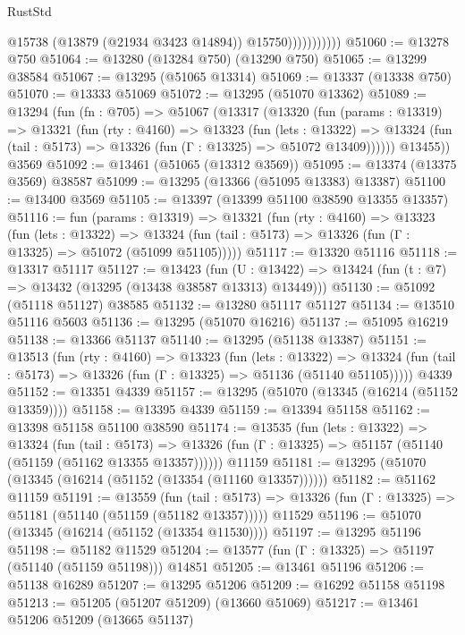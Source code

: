 \begin{lexlean}{RustStd}
\begin{coremodule}
                          @15738
                          (@13879 (@21934 @3423 @14894))
                          @15750)))))))))))
@51060 := @13278 @750
@51064 := @13280 (@13284 @750) (@13290 @750)
@51065 := @13299 @38584
@51067 := @13295 (@51065 @13314)
@51069 := @13337 (@13338 @750)
@51070 := @13333 @51069
@51072 := @13295 (@51070 @13362)
@51089 := @13294
    (fun (fn : @705) =>
    @51067
      (@13317
        (@13320
          (fun (params : @13319) =>
          @13321
            (fun (rty : @4160) =>
            @13323
              (fun (lets : @13322) =>
              @13324 (fun (tail : @5173) => @13326 (fun (Γ : @13325) => @51072 @13409))))))
        @13455))
    @3569
@51092 := @13461 (@51065 (@13312 @3569))
@51095 := @13374 (@13375 @3569) @38587
@51099 := @13295 (@13366 (@51095 @13383) @13387)
@51100 := @13400 @3569
@51105 := @13397 (@13399 @51100 @38590 @13355 @13357)
@51116 := fun (params : @13319) =>
  @13321
    (fun (rty : @4160) =>
    @13323
      (fun (lets : @13322) =>
      @13324 (fun (tail : @5173) => @13326 (fun (Γ : @13325) => @51072 (@51099 @51105)))))
@51117 := @13320 @51116
@51118 := @13317 @51117
@51127 := @13423
    (fun (U : @13422) => @13424 (fun (t : @7) => @13432 (@13295 (@13438 @38587 @13313) @13449)))
@51130 := @51092 (@51118 @51127) @38585
@51132 := @13280 @51117 @51127
@51134 := @13510 @51116 @5603
@51136 := @13295 (@51070 @16216)
@51137 := @51095 @16219
@51138 := @13366 @51137
@51140 := @13295 (@51138 @13387)
@51151 := @13513
    (fun (rty : @4160) =>
    @13323
      (fun (lets : @13322) =>
      @13324 (fun (tail : @5173) => @13326 (fun (Γ : @13325) => @51136 (@51140 @51105)))))
    @4339
@51152 := @13351 @4339
@51157 := @13295 (@51070 (@13345 (@16214 (@51152 @13359))))
@51158 := @13395 @4339
@51159 := @13394 @51158
@51162 := @13398 @51158 @51100 @38590
@51174 := @13535
    (fun (lets : @13322) =>
    @13324
      (fun (tail : @5173) =>
      @13326 (fun (Γ : @13325) => @51157 (@51140 (@51159 (@51162 @13355 @13357))))))
    @11159
@51181 := @13295 (@51070 (@13345 (@16214 (@51152 (@13354 (@11160 @13357))))))
@51182 := @51162 @11159
@51191 := @13559
    (fun (tail : @5173) => @13326 (fun (Γ : @13325) => @51181 (@51140 (@51159 (@51182 @13357)))))
    @11529
@51196 := @51070 (@13345 (@16214 (@51152 (@13354 @11530))))
@51197 := @13295 @51196
@51198 := @51182 @11529
@51204 := @13577 (fun (Γ : @13325) => @51197 (@51140 (@51159 @51198))) @14851
@51205 := @13461 @51196
@51206 := @51138 @16289
@51207 := @13295 @51206
@51209 := @16292 @51158 @51198
@51213 := @51205 (@51207 @51209) (@13660 @51069)
@51217 := @13461 @51206 @51209 (@13665 @51137)

\end{coremodule}
\end{lexlean}
